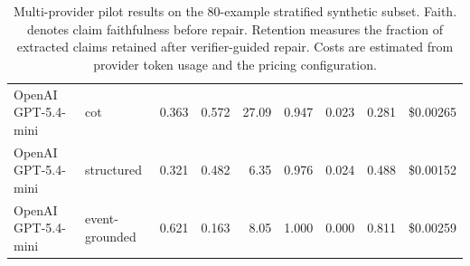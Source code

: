 \begin{table}[t]
{\begin{tabular}{llrrrrrrr}
OpenAI GPT-5.4-mini & cot & 0.363 & 0.572 & 27.09 & 0.947 & 0.023 & 0.281 & \$0.00265 \\
OpenAI GPT-5.4-mini & structured & 0.321 & 0.482 & 6.35 & 0.976 & 0.024 & 0.488 & \$0.00152 \\
OpenAI GPT-5.4-mini & event-grounded & 0.621 & 0.163 & 8.05 & 1.000 & 0.000 & 0.811 & \$0.00259 \\
\bottomrule
\end{tabular}
}
\caption{Multi-provider pilot results on the 80-example stratified synthetic subset. Faith. denotes claim faithfulness before repair. Retention measures the fraction of extracted claims retained after verifier-guided repair. Costs are estimated from provider token usage and the pricing configuration.}
\label{tab:pilot-results}
\end{table}

